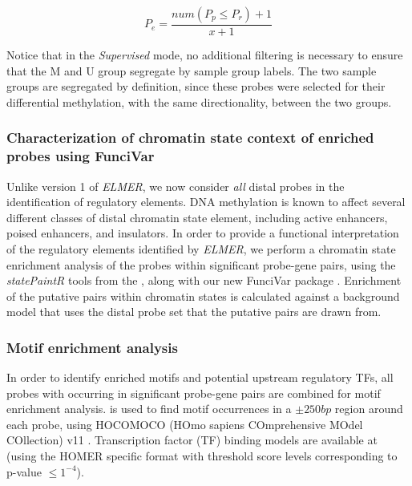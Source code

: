 \begin{equation}
	P_e = \frac{num(P_p \leq P_r)+ 1}{x+1}
\end{equation}

Notice that in the \textit{Supervised} mode, no additional filtering is necessary to ensure that the M and U group segregate by sample group labels.  The two sample groups are segregated by definition, since these probes were selected for their differential methylation, with the same directionality, between the two groups. 



\subsubsection{Characterization of chromatin state context of enriched probes using FunciVar}

Unlike version 1 of \textit{ELMER}, we now consider \textit{all} distal probes in the identification of regulatory elements. DNA methylation is known to affect several different classes of distal chromatin state element, including active enhancers, poised enhancers, and insulators. In order to provide a functional interpretation of the regulatory elements identified by \textit{ELMER}, we perform a chromatin state enrichment analysis of the probes within significant probe-gene pairs, using the \textit{statePaintR} tools from the  \cite{statepaintr}, along with our new FunciVar package \cite{funcivar}. Enrichment of the putative pairs within chromatin states is calculated against a background model that uses the distal probe set that the putative pairs are drawn from. 

\subsubsection*{Motif enrichment analysis}
In order to identify enriched motifs and potential upstream regulatory TFs, all probes with occurring in significant probe-gene pairs are combined for motif enrichment analysis.  \cite{heinz2010simple} is used to find motif occurrences in a $\pm 250bp$ region around each probe, using HOCOMOCO (HOmo sapiens COmprehensive MOdel COllection) v11 \cite{kulakovskiy2016hocomoco}. Transcription factor (TF) binding models are available at  (using the HOMER specific format with threshold score levels corresponding to p-value $ \leq 1^{-4}$). 

